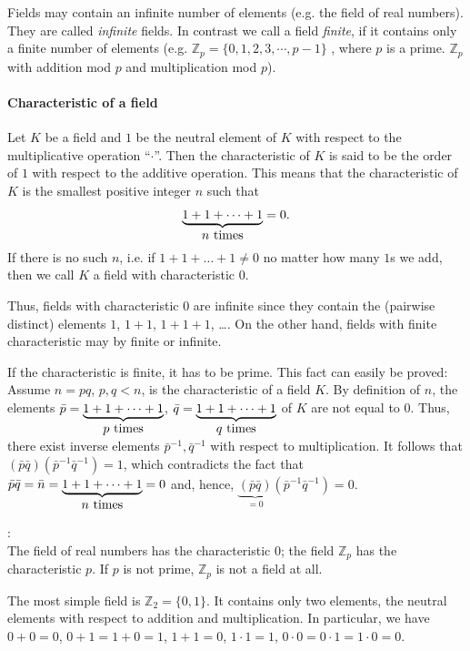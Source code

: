 Fields may contain an infinite number of elements (e.g. the field of real numbers). They are called {\em infinite} fields. In contrast we call a field
{\em finite}, if it contains only a finite number of elements (e.g. ${\mathbb Z}_p = \{0, 1, 2, 3, \cdots, p-1\}$
, where $p$ is a prime. ${\mathbb Z}_p$ with addition mod $p$ and multiplication
mod $p$).
\paragraph{Characteristic of a field}
Let $K$ be a field and $1$ be the neutral element of $K$ with
respect to the multiplicative operation ``$\cdot$''. Then the characteristic of $K$ is said to be the order of $1$ with respect to the additive operation. This means that the characteristic of $K$ is the smallest positive integer $n$ such that
$$ \underbrace{1+1+\dots+1}_{\hbox{$n$ times}} =0 .
$$
If there is no such $n$, i.e. if $1+1+\dots+1\ne 0$ no matter how many $1$s we add, then we call $K$ a field
with characteristic $0$.

Thus, fields with characteristic $0$ are infinite since they contain the (pairwise distinct) elements $1$, $1+1$, $1+1+1$, \dots. On the other hand, fields with finite characteristic may by finite or infinite.

If the characteristic is finite, it has to be prime. This fact can easily be proved: Assume $n=pq$, $p,q<n$, is the characteristic of a field $K$. By definition of $n$, the elements $\bar p=\underbrace{1+1+\dots+1}_{\hbox{$p$ times}}$, $\bar q=\underbrace{1+1+\dots+1}_{\hbox{$q$ times}}$ of $K$ are not equal to $0$. Thus, there exist inverse elements $\bar p^{-1},\bar q^{-1}$ with respect to multiplication. It follows that $(\bar p\bar q)(\bar p^{-1}\bar q^{-1})=1$, which contradicts the fact that $\bar p\bar q=\bar n=\underbrace{1+1+\dots+1}_{\hbox{$n$ times}}=0$ and, hence, $\underbrace{(\bar p\bar q)}_{=0}(\bar p^{-1}\bar q^{-1})=0$.

\begin{remark}{:}\\
The field of real numbers has the characteristic $0$; the field ${\mathbb Z}_p$ has
the characteristic $p$. If $p$ is not prime, ${\mathbb Z}_p$ is not a field at all.
\end{remark}

The most simple field is ${\mathbb Z}_2=\{ 0,1\}$. It contains only two elements, the neutral elements with respect to addition and multiplication. In particular, we have $0+0=0$, $0+1=1+0=1$, $1+1=0$, $1\cdot 1=1$, $0\cdot 0=0\cdot 1=1\cdot 0=0$.

